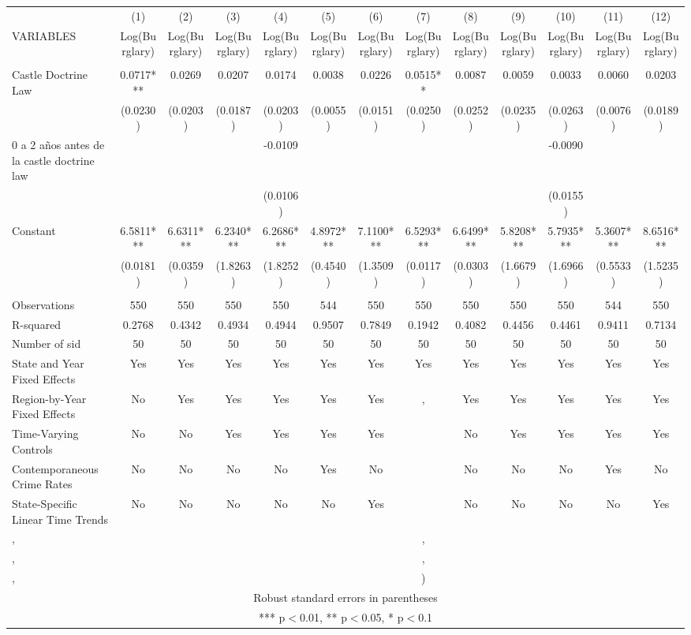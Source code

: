 \documentclass[]{article}
\begin{document}
\begin{tabular}{lcccccccccccc} \hline
 & (1) & (2) & (3) & (4) & (5) & (6) & (7) & (8) & (9) & (10) & (11) & (12) \\
VARIABLES & Log(Burglary) & Log(Burglary) & Log(Burglary) & Log(Burglary) & Log(Burglary) & Log(Burglary) & Log(Burglary) & Log(Burglary) & Log(Burglary) & Log(Burglary) & Log(Burglary) & Log(Burglary) \\ \hline
 &  &  &  &  &  &  &  &  &  &  &  &  \\
Castle Doctrine Law & 0.0717*** & 0.0269 & 0.0207 & 0.0174 & 0.0038 & 0.0226 & 0.0515** & 0.0087 & 0.0059 & 0.0033 & 0.0060 & 0.0203 \\
 & (0.0230) & (0.0203) & (0.0187) & (0.0203) & (0.0055) & (0.0151) & (0.0250) & (0.0252) & (0.0235) & (0.0263) & (0.0076) & (0.0189) \\
0 a 2 años antes de la castle doctrine law &  &  &  & -0.0109 &  &  &  &  &  & -0.0090 &  &  \\
 &  &  &  & (0.0106) &  &  &  &  &  & (0.0155) &  &  \\
Constant & 6.5811*** & 6.6311*** & 6.2340*** & 6.2686*** & 4.8972*** & 7.1100*** & 6.5293*** & 6.6499*** & 5.8208*** & 5.7935*** & 5.3607*** & 8.6516*** \\
 & (0.0181) & (0.0359) & (1.8263) & (1.8252) & (0.4540) & (1.3509) & (0.0117) & (0.0303) & (1.6679) & (1.6966) & (0.5533) & (1.5235) \\
 &  &  &  &  &  &  &  &  &  &  &  &  \\
Observations & 550 & 550 & 550 & 550 & 544 & 550 & 550 & 550 & 550 & 550 & 544 & 550 \\
R-squared & 0.2768 & 0.4342 & 0.4934 & 0.4944 & 0.9507 & 0.7849 & 0.1942 & 0.4082 & 0.4456 & 0.4461 & 0.9411 & 0.7134 \\
Number of sid & 50 & 50 & 50 & 50 & 50 & 50 & 50 & 50 & 50 & 50 & 50 & 50 \\
State and Year Fixed Effects & Yes & Yes & Yes & Yes & Yes & Yes & Yes & Yes & Yes & Yes & Yes & Yes \\
Region-by-Year Fixed Effects & No & Yes & Yes & Yes & Yes & Yes & , & Yes & Yes & Yes & Yes & Yes \\
Time-Varying Controls & No & No & Yes & Yes & Yes & Yes &  & No & Yes & Yes & Yes & Yes \\
Contemporaneous Crime Rates & No & No & No & No & Yes & No &  & No & No & No & Yes & No \\
State-Specific Linear Time Trends & No & No & No & No & No & Yes &  & No & No & No & No & Yes \\
, &  &  &  &  &  &  & , &  &  &  &  &  \\
, &  &  &  &  &  &  & , &  &  &  &  &  \\
 , &  &  &  &  &  &  & ) &  &  &  &  &  \\ \hline
\multicolumn{13}{c}{ Robust standard errors in parentheses} \\
\multicolumn{13}{c}{ *** p$<$0.01, ** p$<$0.05, * p$<$0.1} \\
\end{tabular}
\end{document}
